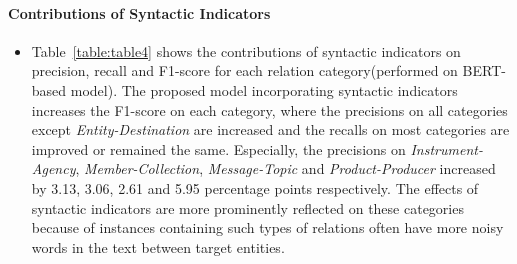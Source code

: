 \documentclass[conference]{IEEEtran}
\begin{document}
\paragraph{Contributions of Syntactic Indicators}
\begin{itemize}
\item Table~\ref{table:table4} shows the contributions of syntactic indicators on precision, recall and F1-score for each relation category(performed on BERT-based model). The proposed model incorporating syntactic indicators increases the F1-score on each category, where the precisions on all categories except {\em Entity-Destination} are increased and the recalls on most categories are improved or remained the same. Especially, the precisions on {\em Instrument-Agency}, {\em Member-Collection}, {\em Message-Topic} and {\em Product-Producer} increased by 3.13, 3.06, 2.61 and 5.95 percentage points respectively. The effects of syntactic indicators are more prominently reflected on these categories because of instances containing such types of relations often have more noisy words in the text between target entities.
\end{itemize}
\end{document}
